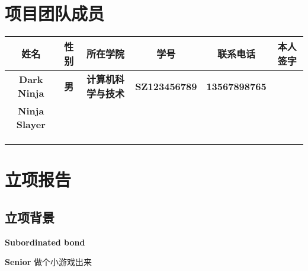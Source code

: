 \documentclass[12pt]{article}
\begin{document}
\section{ 项目团队成员 }
\begin{table}[h]
	\centering
	\begin{adjustbox}{width=1\textwidth}
		\begin{tabular}{|c|c|c|c|c|c|}
			\hline
			\textbf{姓名}         & \textbf{性别} & \textbf{所在学院}         & \textbf{学号}        & \textbf{联系电话}    & \textbf{本人签字} \\ \hline
			\textbf{Dark Ninja}   & \textbf{男}   & \textbf{计算机科学与技术} & \textbf{SZ123456789} & \textbf{13567898765} & \textbf{}         \\ \hline
			\textbf{Ninja Slayer} & \textbf{}     & \textbf{}                 & \textbf{}            & \textbf{}            & \textbf{}         \\ \hline
			\textbf{}             & \textbf{}     & \textbf{}                 & \textbf{}            & \textbf{}            & \textbf{}         \\ \hline
			\textbf{}             & \textbf{}     & \textbf{}                 & \textbf{}            & \textbf{}            & \textbf{}         \\ \hline
			\textbf{}             & \textbf{}     & \textbf{}                 & \textbf{}            & \textbf{}            & \textbf{}         \\ \hline
		\end{tabular}
	\end{adjustbox}
\end{table}

\section{ 立项报告 }
\subsection{ 立项背景 }
\begin{stretchbox}{%
		\textbf{Subordinated bond}
		\par
		\textbf{Senior} 做个小游戏出来%
		\vfill
		\hfill
	}
\end{stretchbox}
\end{document}

